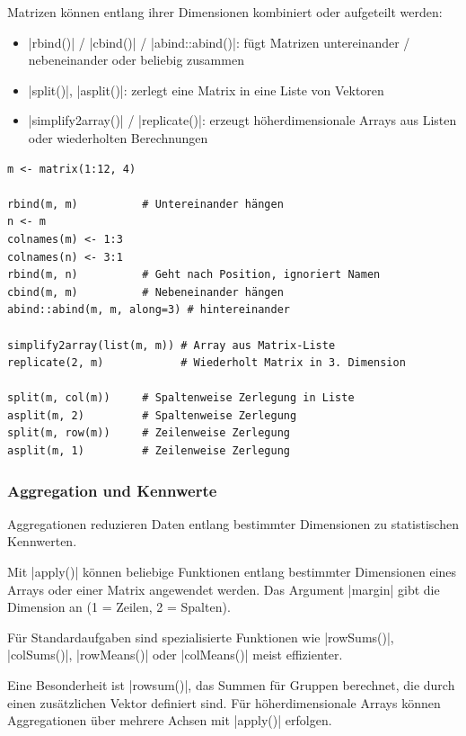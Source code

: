 \documentclass[10pt,twocolumn]{scrartcl}
\renewcommand{\lstinline}{\mycoloredinline}
\begin{document}
Matrizen können entlang ihrer Dimensionen kombiniert oder aufgeteilt werden:
\begin{itemize}
\item \lstinline|rbind()| / \lstinline|cbind()| / \lstinline|abind::abind()|: fügt Matrizen untereinander / nebeneinander oder beliebig zusammen
\item \lstinline|split()|, \lstinline|asplit()|: zerlegt eine Matrix in eine Liste von Vektoren
\item \lstinline|simplify2array()| / \lstinline|replicate()|: erzeugt höherdimensionale Arrays aus Listen oder wiederholten Berechnungen
\end{itemize}

\begin{lstlisting}
m <- matrix(1:12, 4)

rbind(m, m)          # Untereinander hängen
n <- m
colnames(m) <- 1:3
colnames(n) <- 3:1
rbind(m, n)          # Geht nach Position, ignoriert Namen
cbind(m, m)          # Nebeneinander hängen
abind::abind(m, m, along=3) # hintereinander

simplify2array(list(m, m)) # Array aus Matrix-Liste
replicate(2, m)            # Wiederholt Matrix in 3. Dimension

split(m, col(m))     # Spaltenweise Zerlegung in Liste
asplit(m, 2)         # Spaltenweise Zerlegung
split(m, row(m))     # Zeilenweise Zerlegung
asplit(m, 1)         # Zeilenweise Zerlegung
\end{lstlisting}


\subsubsection{Aggregation und Kennwerte}

Aggregationen reduzieren Daten entlang bestimmter Dimensionen zu statistischen Kennwerten. 

Mit \lstinline|apply()| können beliebige Funktionen entlang bestimmter Dimensionen eines Arrays oder einer Matrix angewendet werden. 
Das Argument \lstinline|margin| gibt die Dimension an (1 = Zeilen, 2 = Spalten).

Für Standardaufgaben sind spezialisierte Funktionen wie \lstinline|rowSums()|, \lstinline|colSums()|, \lstinline|rowMeans()| oder \lstinline|colMeans()| meist effizienter. 

Eine Besonderheit ist \lstinline|rowsum()|, das Summen für Gruppen berechnet, die durch einen zusätzlichen Vektor definiert sind. Für höherdimensionale Arrays können Aggregationen über mehrere Achsen mit \lstinline|apply()| erfolgen.
\end{document}
